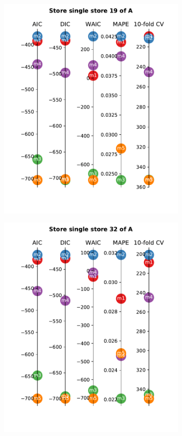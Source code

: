 \documentclass[english, 12pt, a4paper, sci, utf8, a-1b, online]{aaltothesis}
\begin{document}
\begin{figure}[hbt]
\begin{subfigure}[htb]{0.3\textwidth}
		\includegraphics[width=\textwidth]{../plots/metrics/metrics_plot_single_store_19_of_A.pdf}
	\end{subfigure}
	\hfill
	\begin{subfigure}[htb]{0.3\textwidth}
		\centering
		\includegraphics[width=\textwidth]{../plots/metrics/metrics_plot_single_store_32_of_A.pdf}

\end{subfigure}
\end{figure}
\end{document}
